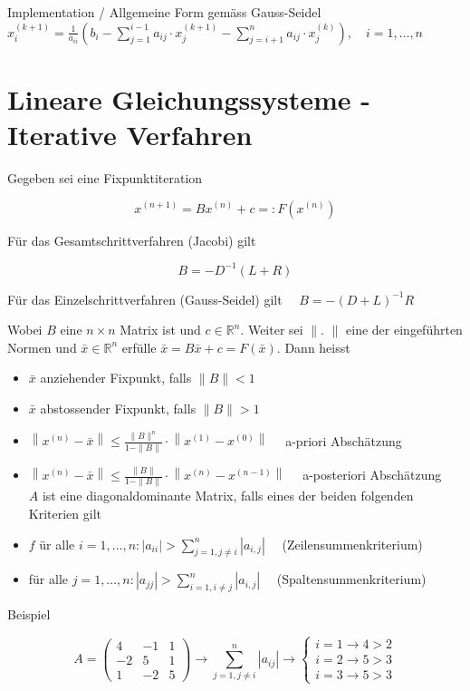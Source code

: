 \documentclass[10pt]{article}
\begin{document}
Implementation / Allgemeine Form gemäss Gauss-Seidel\\
$x_{i}^{(k+1)}=\frac{1}{a_{i i}}\left(b_{i}-\sum_{j=1}^{i-1} a_{i j} \cdot x_{j}^{(k+1)}-\sum_{j=i+1}^{n} a_{i j} \cdot x_{j}^{(k)}\right), \quad i=1, \ldots, n$

\section*{Lineare Gleichungssysteme - Iterative Verfahren}
Gegeben sei eine Fixpunktiteration

$$
x^{(n+1)}=B x^{(n)}+c=: F\left(x^{(n)}\right)
$$

Für das Gesamtschrittverfahren (Jacobi) gilt

$$
B=-D^{-1}(L+R)
$$

Für das Einzelschrittverfahren (Gauss-Seidel) gilt $\quad B=-(D+L)^{-1} R$

Wobei $B$ eine $n \times n$ Matrix ist und $c \in \mathbb{R}^{n}$. Weiter sei $\|$. $\|$ eine der eingeführten Normen und $\bar{x} \in \mathbb{R}^{n}$ erfülle $\bar{x}=B \bar{x}+c=F(\bar{x})$. Dann heisst

\begin{itemize}
  \item $\bar{x}$ anziehender Fixpunkt, falls $\|B\|<1$
  \item $\bar{x}$ abstossender Fixpunkt, falls $\|B\|>1$
  \item $\left\|x^{(n)}-\bar{x}\right\| \leq \frac{\|B\|^{n}}{1-\|B\|} \cdot\left\|x^{(1)}-x^{(0)}\right\| \quad$ a-priori Abschätzung
  \item $\left\|x^{(n)}-\bar{x}\right\| \leq \frac{\|B\|}{1-\|B\|} \cdot\left\|x^{(n)}-x^{(n-1)}\right\| \quad$ a-posteriori Abschätzung\\
$A$ ist eine diagonaldominante Matrix, falls eines der beiden folgenden Kriterien gilt
  \item $f$ ür alle $i=1, \ldots, n:\left|a_{i i}\right|>\sum_{j=1, j \neq i}^{n}\left|a_{i, j}\right| \quad$ (Zeilensummenkriterium)
  \item für alle $j=1, \ldots, n:\left|a_{j j}\right|>\sum_{i=1, i \neq j}^{n}\left|a_{i, j}\right| \quad$ (Spaltensummenkriterium)
\end{itemize}

Beispiel

$$
A=\left(\begin{array}{ccc}
4 & -1 & 1 \\
-2 & 5 & 1 \\
1 & -2 & 5
\end{array}\right) \rightarrow \sum_{j=1, j \neq i}^{n}\left|a_{i j}\right| \rightarrow\left\{\begin{array}{l}
i=1 \rightarrow 4>2 \\
i=2 \rightarrow 5>3 \\
i=3 \rightarrow 5>3
\end{array}\right.
$$
\end{document}
